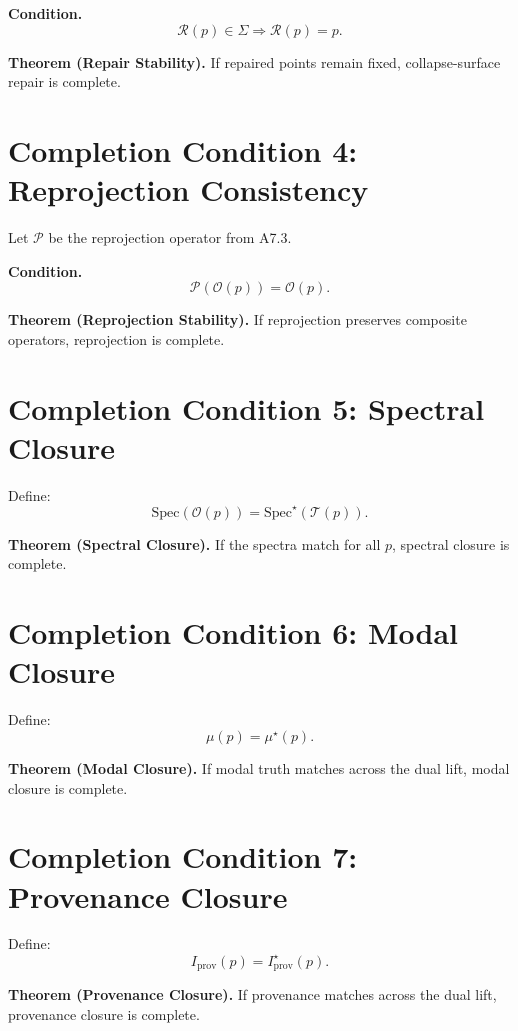 \documentclass[11pt]{article}
\begin{document}
\textbf{Condition.}
\[
\mathcal{R}(p) \in \Sigma \Rightarrow \mathcal{R}(p) = p.
\]

\textbf{Theorem (Repair Stability).}
If repaired points remain fixed, collapse-surface repair is complete.

\section{Completion Condition 4: Reprojection Consistency}

Let $\mathcal{P}$ be the reprojection operator from A7.3.

\textbf{Condition.}
\[
\mathcal{P}(\mathcal{O}(p)) = \mathcal{O}(p).
\]

\textbf{Theorem (Reprojection Stability).}
If reprojection preserves composite operators, reprojection is complete.

\section{Completion Condition 5: Spectral Closure}

Define:
\[
\mathrm{Spec}(\mathcal{O}(p)) = \mathrm{Spec}^\star(\mathcal{T}(p)).
\]

\textbf{Theorem (Spectral Closure).}
If the spectra match for all $p$, spectral closure is complete.

\section{Completion Condition 6: Modal Closure}

Define:
\[
\mu(p) = \mu^\star(p).
\]

\textbf{Theorem (Modal Closure).}
If modal truth matches across the dual lift, modal closure is complete.

\section{Completion Condition 7: Provenance Closure}

Define:
\[
I_{\mathrm{prov}}(p) = I^\star_{\mathrm{prov}}(p).
\]

\textbf{Theorem (Provenance Closure).}
If provenance matches across the dual lift, provenance closure is complete.
\end{document}
